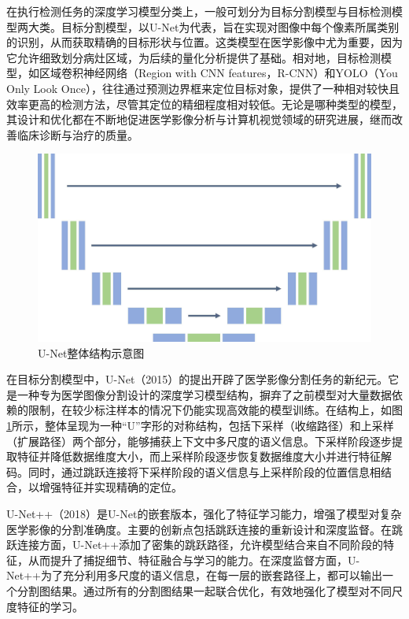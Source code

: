 在执行检测任务的深度学习模型分类上，一般可划分为目标分割模型与目标检测模型两大类。目标分割模型，以U-Net\cite{ronneberger2015u}为代表，旨在实现对图像中每个像素所属类别的识别，从而获取精确的目标形状与位置。这类模型在医学影像中尤为重要，因为它允许细致划分病灶区域，为后续的量化分析提供了基础。相对地，目标检测模型，如区域卷积神经网络（Region with CNN features，R-CNN）\cite{girshick2014rich}和YOLO（You Only Look Once）\cite{redmon2016you}，往往通过预测边界框来定位目标对象，提供了一种相对较快且效率更高的检测方法，尽管其定位的精细程度相对较低。无论是哪种类型的模型，其设计和优化都在不断地促进医学影像分析与计算机视觉领域的研究进展，继而改善临床诊断与治疗的质量。

\begin{figure}[htbp]
  \centering
  \includegraphics[width=\textwidth]{figures/chap02_unet.jpg}
  \caption{U-Net整体结构示意图}
  \label{fig:chap02_unet}
\end{figure}

在目标分割模型中，U-Net\cite{ronneberger2015u}（2015）的提出开辟了医学影像分割任务的新纪元。它是一种专为医学图像分割设计的深度学习模型结构，摒弃了之前模型对大量数据依赖的限制，在较少标注样本的情况下仍能实现高效能的模型训练。在结构上，如图\ref{fig:chap02_unet}所示，整体呈现为一种“U”字形的对称结构，包括下采样（收缩路径）和上采样（扩展路径）两个部分，能够捕获上下文中多尺度的语义信息。下采样阶段逐步提取特征并降低数据维度大小，而上采样阶段逐步恢复数据维度大小并进行特征解码。同时，通过跳跃连接将下采样阶段的语义信息与上采样阶段的位置信息相结合，以增强特征并实现精确的定位。

U-Net++\cite{zhou2018unet++}（2018）是U-Net\cite{ronneberger2015u}的嵌套版本，强化了特征学习能力，增强了模型对复杂医学影像的分割准确度。主要的创新点包括跳跃连接的重新设计和深度监督。在跳跃连接方面，U-Net++添加了密集的跳跃路径，允许模型结合来自不同阶段的特征，从而提升了捕捉细节、特征融合与学习的能力。在深度监督方面，U-Net++为了充分利用多尺度的语义信息，在每一层的嵌套路径上，都可以输出一个分割图结果。通过所有的分割图结果一起联合优化，有效地强化了模型对不同尺度特征的学习。

